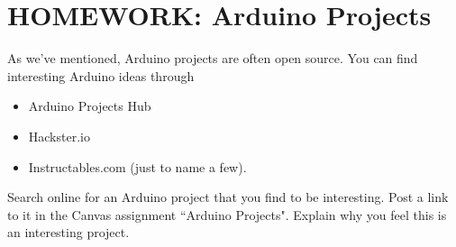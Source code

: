 
\section{HOMEWORK: Arduino Projects}

As we've mentioned, Arduino projects are often open source. You can find interesting Arduino ideas through 

\begin{itemize}
    \item Arduino Projects Hub
    \item Hackster.io
    \item Instructables.com (just to name a few).
\end{itemize}

\begin{exercise}
Search online for an Arduino project that you find to be interesting. Post a link to it in the Canvas assignment ``Arduino Projects". Explain why you feel this is an interesting project.
\end{exercise}